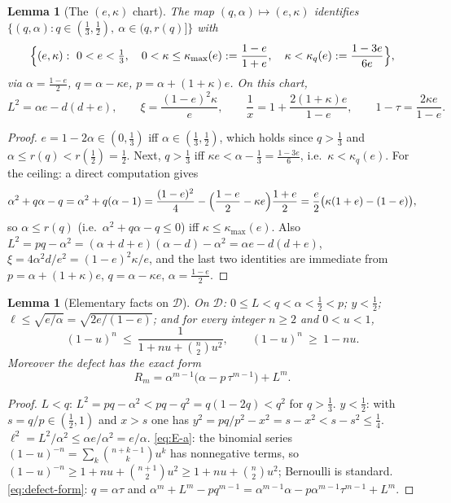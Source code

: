\documentclass[11pt]{article}
\newtheorem{lemma}[theorem]{Lemma}
\begin{document}
\begin{lemma}[The $(e,\kappa)$ chart]\label{lem:chart}
The map $(q,\alpha)\mapsto(e,\kappa)$ identifies
$\{(q,\alpha):q\in(\tfrac13,\tfrac12),\ \alpha\in(q,r(q)]\}$ with
\[
        \Bigl\{(e,\kappa):\ 0<e<\tfrac13,\quad
        0<\kappa\le\kappa_{\max}(e):=\frac{1-e}{1+e},\quad
        \kappa<\kappa_q(e):=\frac{1-3e}{6e}\Bigr\},
\]
via $\alpha=\frac{1-e}2$, $q=\alpha-\kappa e$, $p=\alpha+(1+\kappa)e$.  On this
chart,
\[
        L^2=\alpha e-d(d+e),
        \qquad
        \xi=\frac{(1-e)^2\kappa}{e},
        \qquad
        \frac1x=1+\frac{2(1+\kappa)e}{1-e},
        \qquad
        1-\tau=\frac{2\kappa e}{1-e}.
\]
\end{lemma}

\begin{proof}
$e=1-2\alpha\in(0,\tfrac13)$ iff $\alpha\in(\tfrac13,\tfrac12)$, which holds
since $q>\tfrac13$ and $\alpha\le r(q)<r(\tfrac12)=\tfrac12$.  Next,
$q>\tfrac13$ iff $\kappa e<\alpha-\tfrac13=\frac{1-3e}6$, i.e.\
$\kappa<\kappa_q(e)$.  For the ceiling: a direct computation gives
\[
        \alpha^2+q\alpha-q
        =\alpha^2+q(\alpha-1)
        =\frac{(1-e)^2}4-\Bigl(\frac{1-e}2-\kappa e\Bigr)\frac{1+e}2
        =\frac e2\bigl(\kappa(1+e)-(1-e)\bigr),
\]
so $\alpha\le r(q)$ (i.e.\ $\alpha^2+q\alpha-q\le0$) iff
$\kappa\le\kappa_{\max}(e)$.  Also
$L^2=pq-\alpha^2=(\alpha+d+e)(\alpha-d)-\alpha^2=\alpha e-d(d+e)$,
$\xi=4\alpha^2d/e^2=(1-e)^2\kappa/e$, and the last two identities are
immediate from $p=\alpha+(1+\kappa)e$, $q=\alpha-\kappa e$,
$\alpha=\frac{1-e}2$.
\end{proof}

\begin{lemma}[Elementary facts on $\mathcal D$]\label{lem:elementary}
On $\mathcal D$: $0\le L<q<\alpha<\tfrac12<p$; $y<\tfrac12$;
$\ell\le\sqrt{e/\alpha}=\sqrt{2e/(1-e)}$; and for every integer $n\ge2$ and
$0<u<1$,
\begin{equation}\label{eq:E-a}
        (1-u)^n\ \le\ \frac1{1+nu+\binom n2u^2},
        \qquad
        (1-u)^n\ \ge\ 1-nu .
\end{equation}
Moreover the defect has the exact form
\begin{equation}\label{eq:defect-form}
        R_m=\alpha^{m-1}\bigl(\alpha-p\,\tau^{m-1}\bigr)+L^m .
\end{equation}
\end{lemma}

\begin{proof}
$L<q$: $L^2=pq-\alpha^2<pq-q^2=q(1-2q)<q^2$ for $q>\tfrac13$.
$y<\tfrac12$: with $s=q/p\in(\tfrac12,1)$ and $x>s$ one has
$y^2=pq/p^2-x^2=s-x^2<s-s^2\le\tfrac14$.
$\ell^2=L^2/\alpha^2\le\alpha e/\alpha^2=e/\alpha$.
\eqref{eq:E-a}: the binomial series
$(1-u)^{-n}=\sum_k\binom{n+k-1}ku^k$ has nonnegative terms, so
$(1-u)^{-n}\ge1+nu+\binom{n+1}2u^2\ge1+nu+\binom n2u^2$; Bernoulli is
standard.  \eqref{eq:defect-form}: $q=\alpha\tau$ and
$\alpha^m+L^m-pq^{m-1}
=\alpha^{m-1}\alpha-p\alpha^{m-1}\tau^{m-1}+L^m$.
\end{proof}
\end{document}
